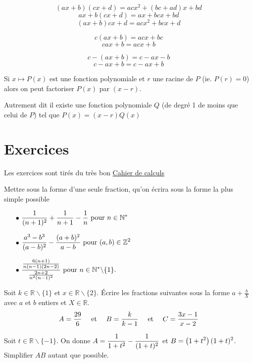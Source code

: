 \documentclass[a4paper, 11pt]{article}
\begin{document}
\begin{prop}
	$$(ax+b)  (cx+d) = acx^2 +(bc+ad) x +bd $$
	$$ax+b   (cx+d) = ax +bc x +bd $$
	$$(ax+b)  cx+d = acx^2 +bc x +d $$


	$$c (ax+b) = acx +bc$$
	$$c ax+b = acx +b$$

	$$c-(ax+b) = c-ax-b$$
	$$c-ax+b = c-ax+b$$
\end{prop}

\begin{prop}
	Si $x\mapsto P(x) $ est une fonction polynomiale et $r$ une racine de $P$ (ie. $P(r)=0$) alors on peut factoriser $P(x)$ par $(x-r)$.

	Autrement dit  il existe une fonction polynomiale $Q$ (de degré 1 de moins que celui de $P$) tel que $P(x)=(x-r)Q(x)$
\end{prop}

\section{Exercices}
Les exercices sont tirés du très bon \href{https://colasbd.github.io/cdc/cahier_de_calcul_enonces_v13.pdf}{Cahier de calculs}
\begin{exercice}
	Mettre sous la forme d’une seule fraction, qu’on écrira sous la forme la plus simple possible
	\begin{itemize}
		\item[$\bullet$] $\displaystyle \frac{1}{(n+1)^2}+\frac{1}{n+1}-\frac{1}{n} \text { pour } n \in \mathbb{N}^* $
		\item[$\bullet$]  $\displaystyle \frac{a^3-b^3}{(a-b)^2}-\frac{(a+b)^2}{a-b} \text { pour }(a, b) \in \mathbb{Z}^2$
		\item[$\bullet$]  $\displaystyle \frac{\frac{6(n+1)}{n(n-1)(2 n-2)}}{\frac{2 n+2}{n^2(n-1)^2}} \text { pour } n \in \mathbb{N}^* \backslash\{1\} .  $
	\end{itemize}
\end{exercice}

\begin{exercice}
	Soit $k \in \mathbb{R} \backslash\{1\}$ et $x \in \mathbb{R} \backslash\{2\}$. Écrire les fractions suivantes sous la forme $a+\frac{b}{X}$ avec $a$ et $b$ entiers et $X \in \mathbb{R}$.
	$$A=\frac{29}{6}\quad \text{ et } \quad B=\frac{k}{k-1} \quad \text{ et } \quad C=\frac{3 x-1}{x-2}$$
\end{exercice}

\begin{exercice}
	Soit $t \in \mathbb{R} \backslash\{-1\}$. On donne $A=\displaystyle \frac{1}{1+t^2}-\frac{1}{(1+t)^2}$ et $B=\displaystyle \left(1+t^2\right)(1+t)^2$.
	Simplifier $A B$ autant que possible.
\end{exercice}
\end{document}
